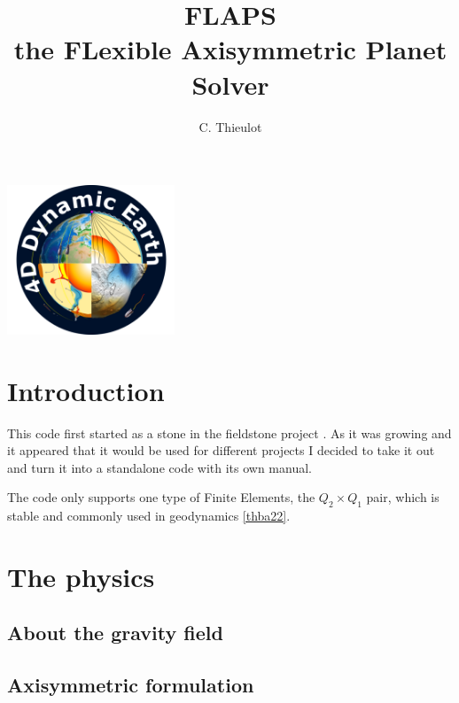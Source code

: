 \documentclass[a4paper,12pt]{article}
\begin{document}
\title{FLAPS \\ the FLexible Axisymmetric Planet Solver}
\author{C. Thieulot}
\maketitle

\begin{center}
\includegraphics[width=5cm]{images/4DDynamicEarth}
\end{center}

\newpage
\section{Introduction}

This code first started as a stone in the fieldstone project \cite{fieldstone}.
As it was growing and it appeared that it would be used for different projects
I decided to take it out and turn it into a standalone code with its own manual.

The code only supports one type of Finite Elements, the $Q_2\times Q_1$ pair, 
which is stable and commonly used in geodynamics \ref{thba22}.

\newpage
\section{The physics}


\subsection{About the gravity field}


\subsection{Axisymmetric formulation}

\end{document}
